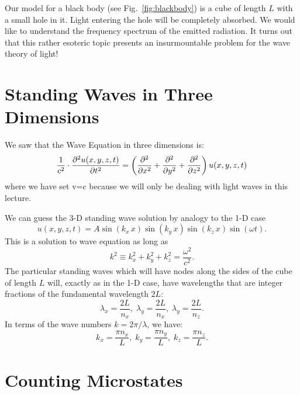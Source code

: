 \documentclass[12pt]{article}
\begin{document}
Our model for a black body (see Fig.~\ref{fig:blackbody}) is a cube of length $L$ with a small hole
in it.  Light entering the hole will be completely absorbed.  We would
like to understand the frequency spectrum of the emitted radiation.
It turns out that this rather esoteric topic presents an insurmountable problem for the wave theory of light!

\section{Standing Waves in Three Dimensions}

We saw that the Wave Equation in three dimensions is:
\begin{equation}\label{eqn:wave3d}
\frac{1}{c^2} \cdot \frac{\partial^2 u(x,y,z,t)}{\partial t^2} = \left( \frac{\partial^2 }{\partial x^2} + \frac{\partial^2 }{\partial y^2} + \frac{\partial^2 }{\partial z^2} \right) u(x,y,z,t) 
\end{equation}  
where we have set v=c because we will only be dealing with light waves in this lecture.

We can guess the 3-D standing wave solution by analogy to the 1-D case
\begin{equation}
u(x,y,z,t) = A \sin(k_x \, x) \sin(k_y \, x) \sin(k_z \, x) \sin( \omega t).
\end{equation}  
This is a solution to wave equation as long as 
\begin{equation}
k^2 \equiv k_x^2 + k_y^2 + k_z^2 = \frac{\omega^2}{c^2}.  
\end{equation}  
The particular standing waves which will have nodes along the sides of the cube of length $L$ will, exactly as in the 1-D case, have wavelengths that are integer fractions of the fundamental wavelength $2L$:
\begin{displaymath}
\lambda_x = \frac{2 L}{n_x}, \; \lambda_y = \frac{2 L}{n_x}, \; \lambda_y = \frac{2 L}{n_z}.
\end{displaymath}
In terms of the wave numbers $k = 2\pi / \lambda$, we have:
\begin{displaymath}
k_x = \frac{\pi n_x}{L}, \; k_y = \frac{\pi n_y}{L}, \; k_z = \frac{\pi n_z}{L}.
\end{displaymath}

\section{Counting Microstates}
\end{document}
